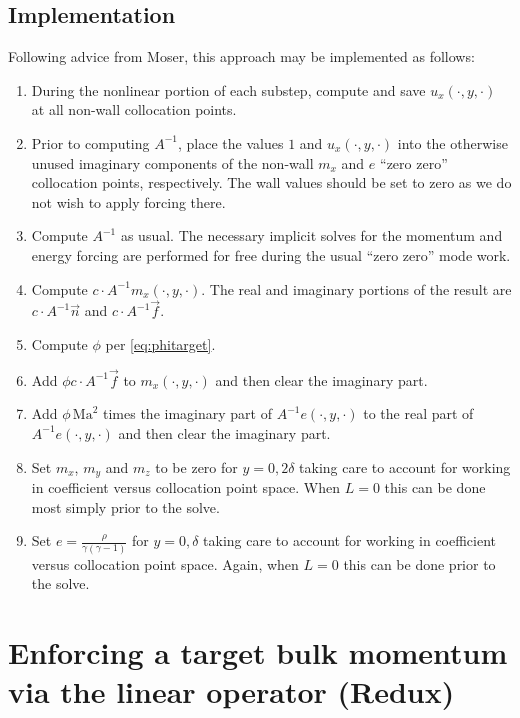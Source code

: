 \documentclass[letterpaper,11pt,nointlimits,reqno]{amsart}
\begin{document}
\subsection{Implementation}

Following advice from Moser, this approach may be implemented as follows:
\begin{enumerate}
  \item During the nonlinear portion of each substep, compute and save
        $u_x\!\left(\cdot,y,\cdot\right)$ at all non-wall collocation points.
  \item Prior to computing $A^{-1}$, place the values $1$ and
        $u_x\!\left(\cdot,y,\cdot\right)$ into the otherwise unused imaginary
        components of the non-wall $m_x$ and $e$ ``zero zero'' collocation
        points, respectively. The wall values should be set to zero as we do
        not wish to apply forcing there.
  \item Compute $A^{-1}$ as usual.  The necessary implicit solves for the
        momentum and energy forcing are performed for free during the usual
        ``zero zero'' mode work.
  \item Compute $c\cdot{}A^{-1}m_x\!\left(\cdot,y,\cdot\right)$.
        The real and imaginary portions of the result are
        $c\cdot{}A^{-1}\vec{n}$ and $c\cdot{}A^{-1}\vec{f}$.
  \item Compute $\phi$ per \eqref{eq:phitarget}.
  \item Add $\phi{}c\cdot{}A^{-1}\vec{f}$ to $m_x\!\left(\cdot,y,\cdot\right)$
        and then clear the imaginary part.
  \item Add $\phi \, \mbox{Ma}^{2}$ times the imaginary part of
        $A^{-1}e\!\left(\cdot,y,\cdot\right)$ to the real part of
        $A^{-1}e\!\left(\cdot,y,\cdot\right)$ and then clear the imaginary
        part.
  \item Set $m_x$, $m_y$ and $m_z$ to be zero for $y=0,2\delta$
        taking care to account for working in coefficient versus collocation
        point space.  When $L = 0$ this can be done most simply prior
        to the solve.
  \item Set $e = \frac{\rho}{\gamma\left(\gamma-1\right)}$ for $y = 0,\delta$
        taking care to account for working in coefficient versus collocation
        point space.  Again, when $L = 0$ this can be done prior to the
        solve.
\end{enumerate}

\section{Enforcing a target bulk momentum via the linear operator (Redux)}
\end{document}

